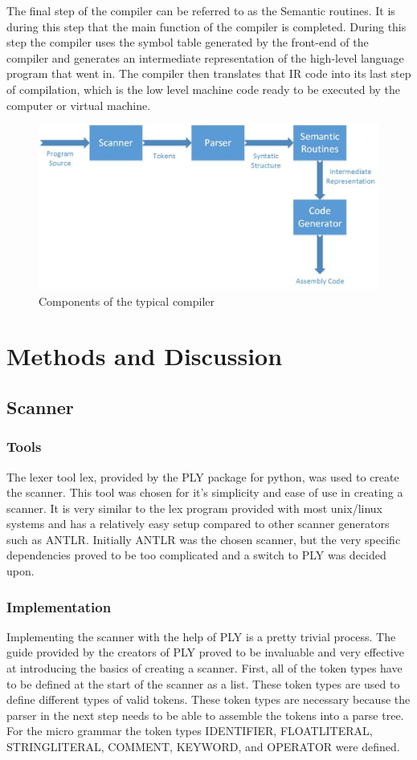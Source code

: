 \documentclass[12pt, oneside]{article}   	%
\begin{document}
The final step of the compiler can be referred to as the Semantic
routines. It is during this step that the main function of the compiler is completed.
During this step the compiler uses the symbol table generated by the front-end of
the compiler and generates an intermediate representation of the high-level
language program that went in. The compiler then translates that IR code into its
last step of compilation, which is the low level machine code ready to be
executed by the computer or virtual machine.

\begin{figure}[h!]
	\centerline{\includegraphics[width=.4\linewidth]{pics/diagram}}
	\caption{Components of the typical compiler}
\end{figure}


\section{Methods and Discussion}
\subsection{Scanner}
\subsubsection{Tools}
The lexer tool lex, provided by the PLY package for python, was used to create the scanner. This tool was chosen for it's simplicity and ease of use in creating a scanner. It is very similar to the lex program provided with most unix/linux systems and has a relatively easy setup compared to other scanner generators such as ANTLR. 
Initially ANTLR was the chosen scanner, but the very specific dependencies proved to be too complicated and a switch to PLY was decided upon. 

\subsubsection{Implementation}
Implementing the scanner with the help of PLY is a pretty trivial process. The guide
provided by the creators of PLY proved to be invaluable and very effective at
introducing the basics of creating a scanner. First, all of the token types have to be defined at the start of the scanner as a
list. These token types are used to define different types of valid tokens. These token types are necessary because the parser in the next step needs to be able to assemble the tokens into a parse tree. For the micro  grammar the token types IDENTIFIER, FLOATLITERAL, STRINGLITERAL, COMMENT, KEYWORD, and OPERATOR were defined.
\end{document}
